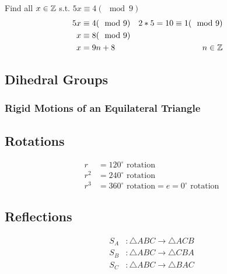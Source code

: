 \begin{example}
    Find all \(x \in\mathbb{Z}\) s.t. \(5x\equiv4(\mod 9) \)
    \begin{align*}
        5x&\equiv4(\mod9) &2*5=10\equiv1(\mod9)\\
        x&\equiv8(\mod9)\\
        x&=9n+8 &n\in\mathbb{Z}&
    \end{align*}
\end{example}

\subsection{Dihedral Groups}
\subsubsection[Symmetry Group for an Equilateral Triangle]{Rigid Motions of an Equilateral Triangle}
\begin{center}
\end{center}

\subsection*{Rotations}
\[
\begin{aligned}
    r &= 120^\circ \text{ rotation} \\
    r^2 &= 240^\circ \text{ rotation} \\
    r^3 &= 360^\circ \text{ rotation} = e = 0^\circ \text{ rotation}
\end{aligned}
\]

\subsection*{Reflections}
\[
\begin{aligned}
    S_A &: \triangle ABC \rightarrow \triangle ACB \\
    S_B &: \triangle ABC \rightarrow \triangle CBA \\
    S_C &: \triangle ABC \rightarrow \triangle BAC \\
\end{aligned}
\]

